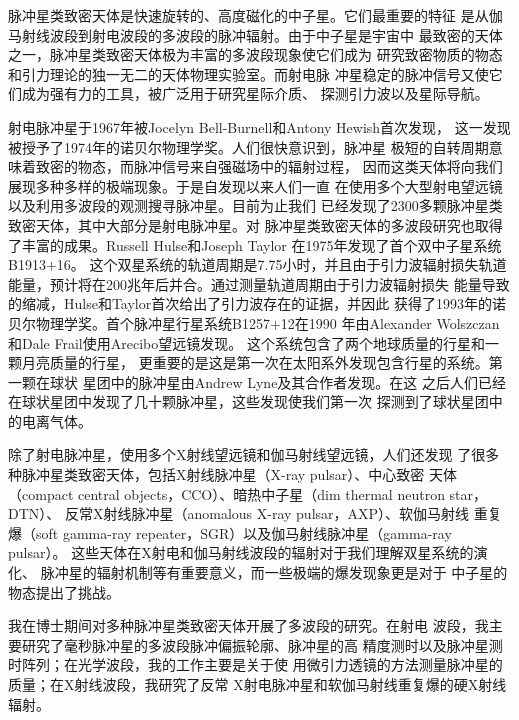 

脉冲星类致密天体是快速旋转的、高度磁化的中子星。它们最重要的特征
是从伽马射线波段到射电波段的多波段的脉冲辐射。由于中子星是宇宙中
最致密的天体之一，脉冲星类致密天体极为丰富的多波段现象使它们成为
研究致密物质的物态和引力理论的独一无二的天体物理实验室。而射电脉
冲星稳定的脉冲信号又使它们成为强有力的工具，被广泛用于研究星际介质、
探测引力波以及星际导航。

射电脉冲星于1967年被Jocelyn Bell-Burnell和Antony Hewish首次发现\supercite{hbp+68}，
这一发现被授予了1974年的诺贝尔物理学奖。人们很快意识到，脉冲星
极短的自转周期意味着致密的物态，而脉冲信号来自强磁场中的辐射过程，
因而这类天体将向我们展现多种多样的极端现象。于是自发现以来人们一直
在使用多个大型射电望远镜以及利用多波段的观测搜寻脉冲星。目前为止我们
已经发现了2300多颗脉冲星类致密天体，其中大部分是射电脉冲星。对
脉冲星类致密天体的多波段研究也取得了丰富的成果。Russell Hulse和Joseph Taylor
在1975年发现了首个双中子星系统B1913$+$16\supercite{ht75}。
这个双星系统的轨道周期是7.75小时，并且由于引力波辐射损失轨道
能量，预计将在200兆年后并合。通过测量轨道周期由于引力波辐射损失
能量导致的缩减，Hulse和Taylor首次给出了引力波存在的证据，并因此
获得了1993年的诺贝尔物理学奖。首个脉冲星行星系统B1257$+$12在1990
年由Alexander Wolszczan和Dale Frail使用Arecibo望远镜发现\supercite{wf92}。
这个系统包含了两个地球质量的行星和一颗月亮质量的行星\supercite{wol94}，
更重要的是这是第一次在太阳系外发现包含行星的系统。第一颗在球状
星团中的脉冲星由Andrew Lyne及其合作者发现\supercite{lbm+87}。在这
之后人们已经在球状星团中发现了几十颗脉冲星，这些发现使我们第一次
探测到了球状星团中的电离气体\supercite{fkl+01}。

除了射电脉冲星，使用多个X射线望远镜和伽马射线望远镜，人们还发现
了很多种脉冲星类致密天体，包括X射线脉冲星（X-ray pulsar）、中心致密
天体（compact central objects，CCO）、暗热中子星（dim thermal neutron star，DTN）、
反常X射线脉冲星（anomalous X-ray pulsar，AXP）、软伽马射线
重复爆（soft gamma-ray repeater，SGR）以及伽马射线脉冲星（gamma-ray pulsar）。
这些天体在X射电和伽马射线波段的辐射对于我们理解双星系统的演化、
脉冲星的辐射机制等有重要意义，而一些极端的爆发现象更是对于
中子星的物态提出了挑战\supercite{m08}。

我在博士期间对多种脉冲星类致密天体开展了多波段的研究。在射电
波段，我主要研究了毫秒脉冲星的多波段脉冲偏振轮廓、脉冲星的高
精度测时以及脉冲星测时阵列；在光学波段，我的工作主要是关于使
用微引力透镜的方法测量脉冲星的质量；在X射线波段，我研究了反常
X射电脉冲星和软伽马射线重复爆的硬X射线辐射。

